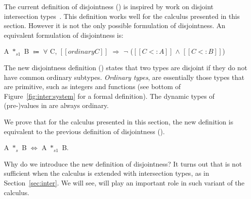 The current definition of disjointness () is inspired
by work on disjoint intersection types~\cite{oliveira2016disjoint}. This definition works well
for the calculus presented in this section. However it is not the only
possible formulation of disjointness.
An equivalent formulation of disjointness is:

\begin{definition}
    A $*_{s1}$ B $\Coloneqq$ $\forall$ C, $[[ordinary C]]$ $\Longrightarrow$ $\neg$ ($[[C <: A]]$ $\wedge$ $[[C <: B]]$)
    \label{def:union:disj1}
  \end{definition}

\noindent
The new disjointness definition () states that two
types are disjoint if they do not have common ordinary subtypes.
\emph{Ordinary types}, are essentially
those types that are primitive, such as integers and functions (see bottom
of Figure~\ref{fig:inter:system} for a formal definition).
The dynamic types of (pre-)values in \name are always ordinary.

We prove that for the calculus presented in this section, the new definition is
equivalent to the previous definition of disjointness
().

\begin{lemma}
A $*_{s}$ B $\Longleftrightarrow$ A $*_{s1}$ B.
\end{lemma}

Why do we introduce the new definition of disjointness? It turns out that
 is not sufficient when the calculus is extended with
intersection types, as in Section~\ref{sec:inter}. We will see,
 will play an important role in such variant of the calculus.

